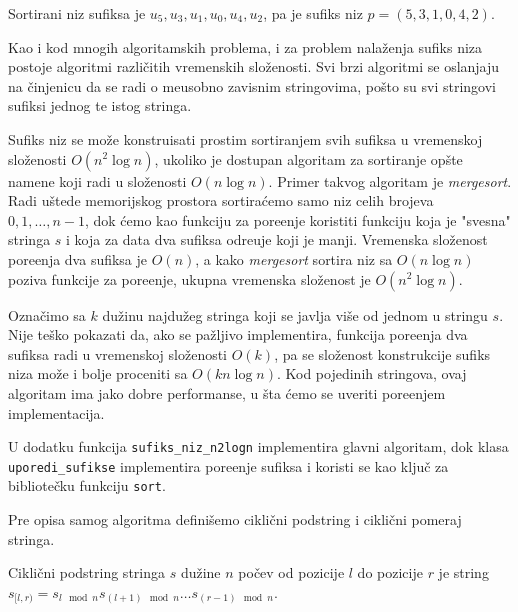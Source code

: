 Sortirani niz sufiksa je $u_5, u_3, u_1, u_0, u_4, u_2$, pa je sufiks niz $p = (5,3,1,0,4,2)$.


Kao i kod mnogih algoritamskih problema, i za problem nala\v zenja sufiks niza postoje algoritmi razli\v citih vremenskih slo\v zenosti. Svi brzi algoritmi se oslanjaju na \v cinjenicu da se radi o me\dj usobno zavisnim stringovima, po\v sto su svi stringovi sufiksi jednog te istog stringa.


Sufiks niz se mo\v ze konstruisati prostim sortiranjem svih sufiksa u vremenskoj slo\v zenosti $O(n^2 \log n)$, ukoliko je dostupan algoritam za sortiranje op\v ste namene koji radi u slo\v zenosti $O(n \log n)$. Primer takvog algoritam je \textit{mergesort}. Radi u\v stede memorijskog prostora sortira\' cemo samo niz celih brojeva $0,1,\ldots,n-1$, dok \' cemo kao funkciju za pore\dj enje koristiti funkciju koja je "svesna" stringa $s$ i koja za data dva sufiksa odre\dj uje koji je manji. Vremenska slo\v zenost pore\dj enja dva sufiksa je $O(n)$, a kako \textit{mergesort} sortira niz sa $O(n \log n)$ poziva funkcije za pore\dj enje, ukupna vremenska slo\v zenost je $O(n^2 \log n)$.

Ozna\v cimo sa $k$ du\v zinu najdu\v zeg stringa koji se javlja vi\v se od jednom u stringu $s$. Nije te\v sko pokazati da, ako se pa\v zljivo implementira, funkcija pore\dj enja dva sufiksa radi u vremenskoj slo\v zenosti $O(k)$, pa se slo\v zenost konstrukcije sufiks niza mo\v ze i bolje proceniti sa $O(kn \log n)$. Kod pojedinih stringova, ovaj algoritam ima jako dobre performanse, u \v sta \' cemo se uveriti pore\dj enjem implementacija.

U dodatku \sirdodatakkod{} funkcija \texttt{sufiks\_niz\_n2logn} implementira glavni algoritam, dok klasa \texttt{uporedi\_sufikse} implementira pore\dj enje sufiksa i koristi se kao klju\v c za bibliote\v cku funkciju \texttt{sort}.


Pre opisa samog algoritma defini\v semo cikli\v cni podstring i cikli\v cni pomeraj stringa.

\begin{dfn}
Cikli\v cni podstring stringa $s$ du\v zine $n$ po\v cev od pozicije $l$ do pozicije $r$ je string $s_{[l, r)} = s_{l \mod n}s_{(l+1)\mod n}\ldots s_{(r-1)\mod n}$.
\end{dfn}

